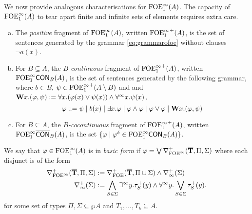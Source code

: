 
We now provide analogous characterisations for $\mathrm{FOE}^{\infty}_1(A)$. The capacity of $\mathrm{FOE}^{\infty}_1(A)$ to tear apart finite and infinite sets of elements requires extra care.

\begin{definition}
\begin{enumerate}[(a)]
\item The \emph{positive} fragment of $\mathrm{FOE}^{\infty}_1(A)$, written ${\mathrm{FOE}^{\infty}_1}^{+}(A)$, is the set of sentences generated by the grammar \eqref{eq:grammarofoe} without clauses $\lnot a(x)$. 
\item For $B \subseteq A$, the \emph{$B$-continuous} fragment of ${\mathrm{FOE}^{\infty}_1}^{+}(A)$, written $\mathrm{FOE}^{\infty}_1\mathsf{CON}_{B}(A)$, is the set of sentences generated by the following grammar, where $b \in B$, $\psi \in {\ensuremath{\mathrm{FOE}^{\infty}_1}}^{+}(A \setminus B)$ and and $\mathbf{W} x.(\varphi,\psi) \mathrel{: =} \forall x.(\varphi(x) \lor \psi(x)) \land \forall^\infty x.\psi(x)$.
\[
\varphi ::= \psi \mid b(x) \mid \exists x.\varphi \mid \varphi \land \varphi \mid \varphi \lor \varphi \mid \mathbf{W} x.(\varphi,\psi)
\]
\item For $B \subseteq A$, the \emph{$B$-cocontinuous} fragment of ${\mathrm{FOE}^{\infty}_1}^{+}(A)$, written $\mathrm{FOE}^{\infty}_1\overline{\mathsf{CON}}_{B}(A)$, is the set $\{\varphi \mid \varphi^\delta \in \mathrm{FOE}^{\infty}_1\mathsf{CON}_{B}(A)\}$.
\end{enumerate}
\end{definition}

\begin{definition}\label{def:basicform-ofoei}
We say that $\varphi \in \mathrm{FOE}^{\infty}_1(A)$ is in \emph{basic form} if $\varphi = \bigvee \nabla^+_{\mathrm{FOE}^{\infty}}(\overline{{\mathbf{T}}},\Pi,\Sigma)$ where each disjunct is of the form
\begin{align*}
	\nabla^+_{\mathrm{FOE}^{\infty}}(\overline{{\mathbf{T}}},\Pi,\Sigma) &:= \nabla^+_{\mathrm{FOE}}(\overline{{\mathbf{T}}},\Pi \cup \Sigma) \land \nabla^+_\infty(\Sigma)\\
	\nabla^+_\infty(\Sigma) &:= \bigwedge_{S\in\Sigma} \exists^\infty y.\tau^{+}_S(y) \land \forall^\infty y.\bigvee_{S\in\Sigma} \tau^{+}_S(y) .
\end{align*}
for some set of types $\Pi,\Sigma \subseteq \wp A$ and $T_1, \dots, T_k \subseteq A$.
\end{definition}

